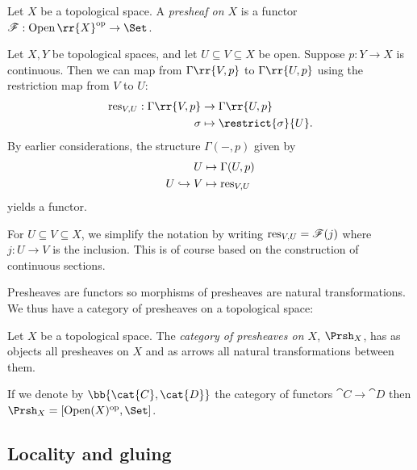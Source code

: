 \documentclass{article}
\begin{document}
\begin{definition}
  Let $X$ be a topological space. A \emph{presheaf on $X$} is a functor
  $\mathscr F:\Open\rr{X}^{\text{op}}\to\Set$.
\end{definition}

\begin{example}
  Let $X, Y$ be topological spaces, and let $U \subseteq V \subseteq X$ be
  open. Suppose $p : Y \to X$ is continuous. Then we can map from
  $\Gamma\rr{V,p}$ to $\Gamma\rr{U,p}$ using the restriction map from $V$ to
  $U$:
  \begin{align*}
    \res_{V,U} : \Gamma\rr{V,p} &\to \Gamma\rr{U,p}\\
    \sigma &\mapsto \restrict{\sigma}{U}.
  \end{align*}
  By earlier considerations, the structure $\Gamma(-,p)$
  given by
  \begin{align*}
    U &\mapsto \Gamma(U,p)\\
    U\hookrightarrow V &\mapsto \operatorname{res}_{V,U}
  \end{align*}
  yields a functor.
\end{example}

\begin{notation}
  For $U\subseteq V\subseteq X$, we simplify the notation by
  writing $\operatorname{res}_{V,U} = \mathscr F(j)$ where $j:U\to V$ is the
  inclusion. This is of course based on the construction of
  continuous sections.
\end{notation}

Presheaves are functors so morphisms of presheaves are natural
transformations. We thus have a category of presheaves on a topological
space:

\begin{definition}
  Let $X$ be a topological space. The \emph{category of presheaves
  on $X$}, $\Prsh_X$, has as objects all presheaves on $X$ and as
  arrows all natural transformations between them.
\end{definition}

If we denote by $\bb{\cat{C},\cat{D}}$ the category of functors
$\cat{C}\to\cat{D}$ then $\Prsh_X = [\Open(X)^{\text{op}},\Set]$.



\subsection{Locality and gluing}
\end{document}

